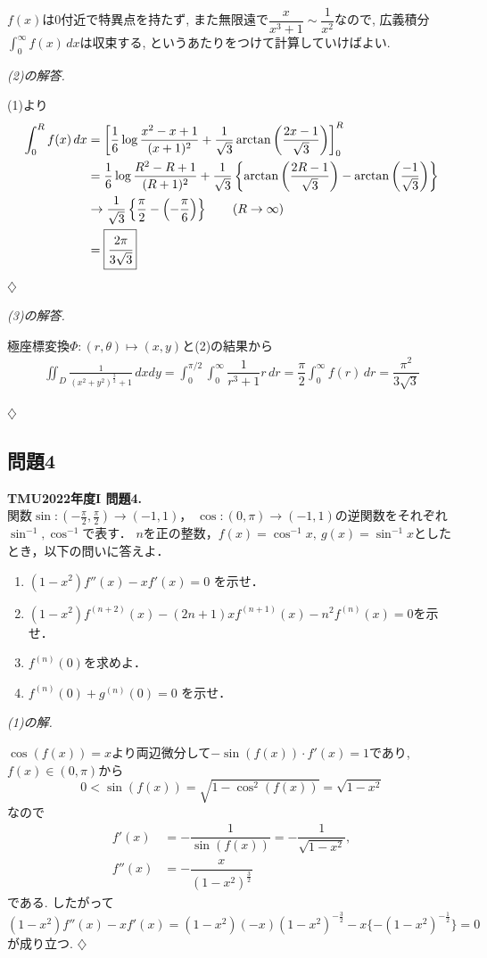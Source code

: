 \documentclass[titlepage]{jsarticle}
\numberwithin{equation}{section}
\newenvironment{kaitou}[1][解]{%
\begin{proofbox}%
\textit{#1. }\ignorespaces
}{%
\hfill$\diamondsuit$%
\end{proofbox}%
}
\begin{document}
$f(x)$は$0$付近で特異点を持たず, また無限遠で$\dfrac{x}{x^3+1}\sim\dfrac{1}{x^2}$なので, 広義積分$\displaystyle{\int_0^\infty f(x)\, dx}$は収束する, というあたりをつけて計算していけばよい.
\begin{kaitou}[(2)の解答]
(1)より
\begin{align*}
\int_0^R f(x)\, dx &= \left[\dfrac{1}{6}\log\dfrac{x^2-x+1}{(x+1)^2} + \dfrac{1}{\sqrt{3}}\arctan\left({\dfrac{2x-1}{\sqrt{3}}}\right)\right]_0^R\\
	&= \dfrac{1}{6}\log\dfrac{R^2-R+1}{(R+1)^2} + \dfrac{1}{\sqrt{3}}\left\{\arctan\left({\dfrac{2R-1}{\sqrt{3}}}\right) - \arctan\left({\dfrac{-1}{\sqrt{3}}}\right)\right\}\\
	& \to \dfrac{1}{\sqrt{3}}\left\{\dfrac{\pi}{2} - \left(-\dfrac{\pi}{6}\right)\right\}\qquad (R \to \infty)\\
	&=\boxed{\cfrac{2\pi}{3\sqrt{3}}}
\end{align*}
\end{kaitou}
\begin{kaitou}[(3)の解答]
極座標変換$\Phi : (r, \theta) \mapsto (x, y)$と(2)の結果から
\begin{align*}
\iint_D \frac{1}{(x^2+y^2)^{\frac{3}{2}}+1}\,dxdy = \int_0^{\pi/2} \int_0^\infty \dfrac{1}{r^3+1} r\, dr = \dfrac{\pi}{2}\int_0^\infty f(r)\, dr 
	=\boxed{\dfrac{\pi^2}{3\sqrt{3}}}
\end{align*}

\end{kaitou}
\subsection{問題4}
\begin{problem}
\textbf{TMU2022年度I 問題4.}\\
関数$\sin:\left(-\frac{\pi}{2},\frac{\pi}{2}\right)\to(-1,1)$，
$\cos:(0,\pi)\to(-1,1)$の逆関数をそれぞれ$\sin^{-1},\cos^{-1}$で表す．
$n$を正の整数，$f(x)=\cos^{-1}x,\ g(x)=\sin^{-1}x$としたとき，以下の問いに答えよ．

\begin{enumerate}[label=(\arabic*)]
\item $(1-x^2)f''(x)-xf'(x)=0$
を示せ．
\item $(1-x^2)f^{(n+2)}(x)-(2n+1)xf^{(n+1)}(x)-n^2f^{(n)}(x)=0$を示せ．
\item $f^{(n)}(0)$を求めよ．
\item $f^{(n)}(0)+g^{(n)}(0)=0$
を示せ．
\end{enumerate}
\end{problem}
\begin{kaitou}[(1)の解]
$\cos(f(x)) = x$より両辺微分して$-\sin(f(x))\cdot f'(x) = 1$であり, $f(x) \in (0, \pi)$から
\[
0 < \sin(f(x)) = \sqrt{1-\cos^2(f(x))} = \sqrt{1-x^2}
\]
なので
\begin{align*}
f'(x) & =  -\dfrac{1}{\sin(f(x))}= -\dfrac{1}{\sqrt{1-x^2}},\\
f''(x) & = -\dfrac{x}{(1-x^2)^{\frac{3}{2}}}
\end{align*}
である. したがって
\[
(1-x^2)f''(x)-xf'(x) = (1-x^2)(-x)(1-x^2)^{-\frac{3}{2}} -x\{-(1-x^2)^{-\frac{1}{2}}\} = 0
\]
が成り立つ.
\end{kaitou}
\end{document}
